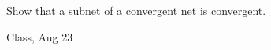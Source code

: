 \begin{samepage}
\begin{ex}
Show that a subnet of a convergent net is convergent.
\end{ex}
\begin{source}
Class, Aug 23
\end{source}
\end{samepage}
